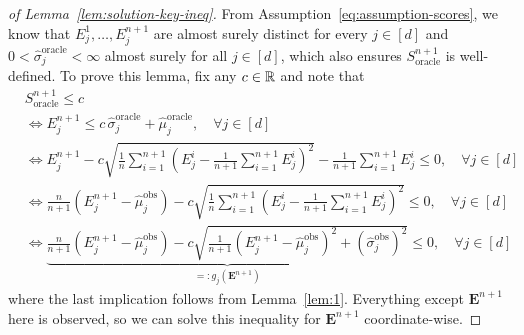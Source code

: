 \begin{proof}[of Lemma~\ref{lem:solution-key-ineq}]
From Assumption~\ref{eq:assumption-scores}, we know that $E^1_j,\dots, E^{n+1}_j$ are almost surely distinct for every $j \in [d]$ and $0<\hat{\sigma}^{\mathrm{oracle}}_j < \infty$ almost surely for all $j \in [d]$, which also ensures $S_{\mathrm{oracle}}^{n+1}$ is well-defined. 
To prove this lemma, fix any $c \in \mathbb{R}$ and note that
\begin{align*}
    &S_{\mathrm{oracle}}^{n+1} \leq c \\
    &\iff E^{n+1}_j \leq c\,\hat{\sigma}^{\mathrm{oracle}}_j + \hat{\mu}^{\mathrm{oracle}}_j, \quad \forall j \in [d]\\
    &\iff {E^{n+1}_j - c\sqrt{\frac{1}{n}\sum^{n+1}_{i=1}\left(E^i_j -\frac{1}{n+1}\sum^{n+1}_{i=1}E^i_j \right)^2} - \frac{1}{n+1}\sum^{n+1}_{i=1}E^i_j} \leq 0, \quad \forall j \in [d]\\
    &\iff {\frac{n}{n+1}\left(E^{n+1}_j-\hat{\mu}^\mathrm{obs}_j\right) - c\sqrt{\frac{1}{n}\sum^{n+1}_{i=1}\left(E^i_j -\frac{1}{n+1}\sum^{n+1}_{i=1}E^i_j \right)^2}} \leq 0, \quad \forall j \in [d]\\
    &\iff \underbrace{\frac{n}{n+1}\left(E^{n+1}_j-\hat{\mu}^\mathrm{obs}_j\right) - c\sqrt{\frac{1}{n+1}\left(E^{n+1}_j-\hat{\mu}^\mathrm{obs}_j\right)^2+(\hat{\sigma}^\mathrm{obs}_j)^2}}_{=: g_j(\mathbf{E}^{n+1})} \leq 0, \quad \forall j \in [d]
\end{align*}
where the last implication follows from Lemma~\ref{lem:1}.
Everything except $\mathbf{E}^{n+1}$ here is observed, so we can solve this inequality for $\mathbf{E}^{n+1}$ coordinate-wise.


\end{proof}

